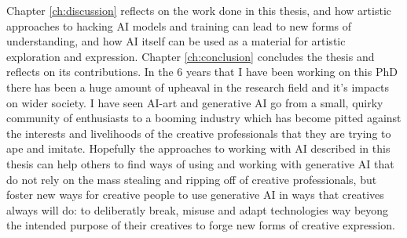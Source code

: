 Chapter \ref{ch:discussion} reflects on the work done in this thesis, and how artistic approaches to hacking AI models and training can lead to new forms of understanding, and how AI itself can be used as a material for artistic exploration and expression.
Chapter \ref{ch:conclusion} concludes the thesis and reflects on its contributions. 
In the 6 years that I have been working on this PhD there has been a huge amount of upheaval in the research field and it's impacts on wider society. 
I have seen AI-art and generative AI go from a small, quirky community of enthusiasts to a booming industry which has become pitted against the interests and livelihoods of the creative professionals that they are trying to ape and imitate.
Hopefully the approaches to working with AI described in this thesis can help others to find ways of using and working with generative AI that do not rely on the mass stealing and ripping off of creative professionals, but foster new ways for creative people to use generative AI in ways that creatives always will do: to deliberatly break, misuse and adapt technologies way beyong the intended purpose of their creatives to forge new forms of creative expression. 
